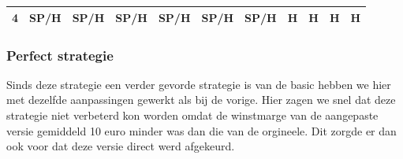 \documentclass[conference]{IEEEtran}
\begin{document}
\begin{table}[htbp]
\begin{tabular}{|c|c|c|c|c|c|c|c|c|c|c|}
\textbf{4} & \cellcolor[HTML]{F8FF00}SP/H & \cellcolor[HTML]{F8FF00}SP/H & \cellcolor[HTML]{F8FF00}SP/H & \cellcolor[HTML]{F8FF00}SP/H & \cellcolor[HTML]{F8FF00}SP/H & \cellcolor[HTML]{F8FF00}SP/H & \cellcolor[HTML]{FE0000}H & \cellcolor[HTML]{FE0000}H & \cellcolor[HTML]{FE0000}H & \cellcolor[HTML]{FE0000}H \\ \hline
\end{tabular}
\end{table}


\subsubsection{Perfect strategie}
Sinds deze strategie een verder gevorde strategie is van de basic hebben we hier met dezelfde aanpassingen gewerkt als bij de vorige. Hier zagen we snel dat deze strategie niet verbeterd kon worden omdat de winstmarge van de aangepaste versie gemiddeld 10 euro minder was dan die van de orgineele. Dit zorgde er dan ook voor dat deze versie direct werd afgekeurd. 
\end{document}
